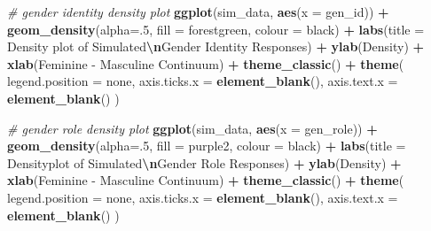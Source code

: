 \documentclass[
]{book}
\newenvironment{Shaded}{\begin{snugshade}}{\end{snugshade}}
\newcommand{\AttributeTok}[1]{\textcolor[rgb]{0.13,0.29,0.53}{#1}}
\newcommand{\CommentTok}[1]{\textcolor[rgb]{0.56,0.35,0.01}{\textit{#1}}}
\newcommand{\DecValTok}[1]{\textcolor[rgb]{0.00,0.00,0.81}{#1}}
\newcommand{\FunctionTok}[1]{\textcolor[rgb]{0.13,0.29,0.53}{\textbf{#1}}}
\newcommand{\NormalTok}[1]{#1}
\newcommand{\SpecialCharTok}[1]{\textcolor[rgb]{0.81,0.36,0.00}{\textbf{#1}}}
\newcommand{\StringTok}[1]{\textcolor[rgb]{0.31,0.60,0.02}{#1}}
\begin{document}
\begin{Shaded}
\begin{Highlighting}[]
\CommentTok{\# gender identity density plot}
\FunctionTok{ggplot}\NormalTok{(sim\_data, }\FunctionTok{aes}\NormalTok{(}\AttributeTok{x =}\NormalTok{ gen\_id)) }\SpecialCharTok{+}
  \FunctionTok{geom\_density}\NormalTok{(}\AttributeTok{alpha=}\NormalTok{.}\DecValTok{5}\NormalTok{, }\AttributeTok{fill =} \StringTok{\textquotesingle{}forestgreen\textquotesingle{}}\NormalTok{, }\AttributeTok{colour =} \StringTok{\textquotesingle{}black\textquotesingle{}}\NormalTok{) }\SpecialCharTok{+}
  \FunctionTok{labs}\NormalTok{(}\AttributeTok{title =} \StringTok{\textquotesingle{}Density plot of Simulated}\SpecialCharTok{\textbackslash{}n}\StringTok{Gender Identity Responses\textquotesingle{}}\NormalTok{) }\SpecialCharTok{+}
  \FunctionTok{ylab}\NormalTok{(}\StringTok{\textquotesingle{}Density\textquotesingle{}}\NormalTok{) }\SpecialCharTok{+} \FunctionTok{xlab}\NormalTok{(}\StringTok{\textquotesingle{}Feminine {-} Masculine Continuum\textquotesingle{}}\NormalTok{) }\SpecialCharTok{+}
  \FunctionTok{theme\_classic}\NormalTok{() }\SpecialCharTok{+}
  \FunctionTok{theme}\NormalTok{(}
    \AttributeTok{legend.position =} \StringTok{\textquotesingle{}none\textquotesingle{}}\NormalTok{,}
    \AttributeTok{axis.ticks.x =} \FunctionTok{element\_blank}\NormalTok{(),}
    \AttributeTok{axis.text.x =} \FunctionTok{element\_blank}\NormalTok{()}
\NormalTok{  )}

\CommentTok{\# gender role density plot}
\FunctionTok{ggplot}\NormalTok{(sim\_data, }\FunctionTok{aes}\NormalTok{(}\AttributeTok{x =}\NormalTok{ gen\_role)) }\SpecialCharTok{+}
  \FunctionTok{geom\_density}\NormalTok{(}\AttributeTok{alpha=}\NormalTok{.}\DecValTok{5}\NormalTok{, }\AttributeTok{fill =} \StringTok{\textquotesingle{}purple2\textquotesingle{}}\NormalTok{, }\AttributeTok{colour =} \StringTok{\textquotesingle{}black\textquotesingle{}}\NormalTok{) }\SpecialCharTok{+}
  \FunctionTok{labs}\NormalTok{(}\AttributeTok{title =} \StringTok{\textquotesingle{}Densityplot of Simulated}\SpecialCharTok{\textbackslash{}n}\StringTok{Gender Role Responses\textquotesingle{}}\NormalTok{) }\SpecialCharTok{+}
  \FunctionTok{ylab}\NormalTok{(}\StringTok{\textquotesingle{}Density\textquotesingle{}}\NormalTok{) }\SpecialCharTok{+} \FunctionTok{xlab}\NormalTok{(}\StringTok{\textquotesingle{}Feminine {-} Masculine Continuum\textquotesingle{}}\NormalTok{) }\SpecialCharTok{+}
  \FunctionTok{theme\_classic}\NormalTok{() }\SpecialCharTok{+}
  \FunctionTok{theme}\NormalTok{(}
    \AttributeTok{legend.position =} \StringTok{\textquotesingle{}none\textquotesingle{}}\NormalTok{,}
    \AttributeTok{axis.ticks.x =} \FunctionTok{element\_blank}\NormalTok{(),}
    \AttributeTok{axis.text.x =} \FunctionTok{element\_blank}\NormalTok{()}
\NormalTok{  )}
\end{Highlighting}
\end{Shaded}
\end{document}
